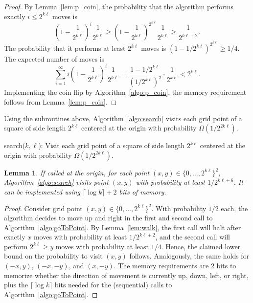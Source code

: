 \documentclass[11pt]{article}
\newtheorem{lemma}[theorem]{Lemma}
\begin{document}
\begin{proof}
By Lemma~\ref{lem:p_coin}, the probability that the algorithm performs exactly $i\leq 2^{k\ell}$ moves is
\begin{equation*}
\left(1-\frac{1}{2^{k\ell}}\right)^i\frac{1}{2^{k\ell}}\geq \left(1-\frac{1}{2^{k\ell}}\right)^{2^{k\ell}}\frac{1}{2^{k\ell}}\geq \frac{1}{2^{k\ell+2}}.
\end{equation*}
The probability that it performs at least $2^{k\ell}$ moves is $(1-1/2^{k\ell})^{2^{k\ell}}\geq 1/4$. The expected number of moves is
\begin{equation*}
\sum_{i=1}^{\infty} i \left(1-\frac{1}{2^{k\ell}}\right)^i\frac{1}{2^{k\ell}}=\frac{1-1/2^{k\ell}}{(1/2^{k\ell})^2}\cdot \frac{1}{2^{k\ell}}<2^{k\ell}.
\end{equation*}
\noindent Implementing the coin flip by Algorithm~\ref{algo:p_coin}, the memory requirement follows from Lemma~\ref{lem:p_coin}.
\end{proof}

Using the subroutines above, Algorithm~\ref{algo:search} visits each grid point of a square of side length $2^{k\ell}$ centered at the origin with probability $\Omega(1/2^{2k\ell})$.

 \begin{algorithm}
\caption{search($k,\ell$): Visit each grid point of a square of side length $2^{k\ell}$ centered at the origin with probability $\Omega(1/2^{2k\ell})$.}
\label{algo:search}
\end{algorithm}

\begin{lemma}
\label{lem:uniformArea}
  If called at the origin, for each point $(x,y) \in \{0,\ldots,2^{k\ell}\}^2$, Algorithm~\ref{algo:search} visits point $(x,y)$ with probability at least $1/2^{k\ell+6}$. It can be implemented using $\lceil \log k \rceil+2$ bits of memory.
\end{lemma}
\begin{proof}
	Consider grid point $(x,y)\in \{0,\ldots,2^{k\ell}\}^2$. With probability $1/2$ each, the algorithm decides to move up and right in the first and second call to Algorithm~\ref{algo:goToPoint}. By Lemma~\ref{lem:walk}, the first call will halt after exactly $x$ moves with probability at least $1/2^{k\ell+2}$, and the second call will perform $2^{k\ell}\geq y$ moves with probability at least $1/4$. Hence, the claimed lower bound on the probability to visit $(x,y)$ follows. Analogously, the same holds for $(-x,y)$, $(-x,-y)$, and $(x,-y)$. The memory requirements are $2$ bits to memorize whether the direction of movement is currently up, down, left, or right, plus the $\lceil \log k \rceil$ bits needed for the (sequential) calls to Algorithm~\ref{algo:goToPoint}.
\end{proof}
\end{document}
